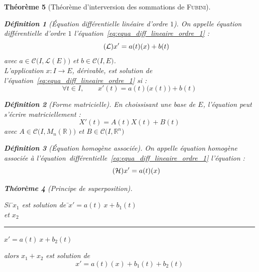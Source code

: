 \documentclass[11pt,a4paper]{report}
\newtheorem{theorem}{Théorème}[chapter]
\theoremstyle{definition}
\newtheorem{dfn}[theorem]{Définition}
\begin{document}
\begin{theorem}[Théorème d'interversion des sommations de \textsc{Fubini}]
{{%
\begin{dfn}[Équation différentielle linéaire d'ordre $1$]
     On appelle \emph{équation différentielle d'ordre $1$} l'équation~\eqref{eq:equa_diff_lineaire_ordre_1} :
     \begin{equation}\tag{\ensuremath{\mathcal{L}}}\label{eq:equa_diff_lineaire_ordre_1}
     x' = a(t)(x) +b(t)
     \end{equation}
     avec $a\in \mathcal{C}\big( I,\mathscr{L}(E)\big)$ et $b\in \mathcal{C}\big( I,E\big)$.\\
     L'application $x : I\to E$, dérivable, est \emph{solution} de l'équation~\eqref{eq:equa_diff_lineaire_ordre_1} si : 
     \begin{equation}
     \forall t\in I,\qquad x'(t) = a(t)\Big( x(t)\Big) +b(t)
     \end{equation}
\end{dfn}
%
\begin{dfn}[Forme matricielle]
     En choissisant une base de $E$, l'équation peut s'écrire matriciellement :
     \begin{equation}
     X'(t)=A(t)X(t)+B(t)
     \end{equation}
     avec $A\in \mathcal{C}\Big( I,M_n (\ensuremath{\mathbb{R}})\Big) $ et $B \in \mathcal{C}\big( I,\ensuremath{\mathbb{R}}^n\big) $
\end{dfn}
\begin{dfn}[Équation homogène associée]
     On appelle \emph{équation homogène} associée à l'équation~différentielle~\eqref{eq:equa_diff_lineaire_ordre_1} l'équation : 
     \begin{equation}\tag{\ensuremath{\mathcal{H}}}\label{eq:equa_diff_homogene_ordre_1}
     x'=a(t)(x)
     \end{equation}
\end{dfn}
\begin{theorem}[Principe de superposition]
     \begin{tabbing}
          Si \=$x_1$ est solution de \=$x'=a(t)~x+b_1(t)$\\
          et \>$x_2$ \rule{6em}{0.4pt} \>$x'=a(t)~x+b_2(t)$
     \end{tabbing}
     alors $x_1+x_2$ est solution de 
     \begin{equation}
     x' = a(t)(x) + b_1(t) + b_2(t)
     \end{equation}
\end{theorem}

}}
\end{theorem}
\end{document}
